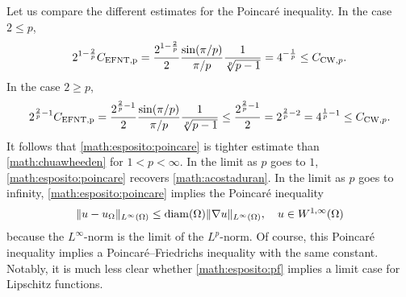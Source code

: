 \documentclass[a4paper]{article}
\begin{document}
\begin{remark}
    Let us compare the different estimates for the Poincar\'e inequality.
    In the case $2 \leq p$, 
    \begin{align*}
        2^{1-\frac 2 p}
        C_{\rm{EFNT},p}
        =
        \frac{ 2^{1-\frac 2 p} }{2}
        \frac{ \sin(\pi/p) }{ \pi/p }
        \frac{ 1 }{ \sqrt[p]{p-1} }
        =
        4^{-\frac 1 p}
        \leq
        C_{{\rm CW},p} 
        .
    \end{align*}
    In the case $2 \geq p$, 
    \begin{align*}
        2^{\frac 2 p - 1}
        C_{\rm{EFNT},p}
        =
        \frac{ 2^{\frac 2 p - 1} }{2}
        \frac{ \sin(\pi/p) }{ \pi/p }
        \frac{ 1 }{ \sqrt[p]{p-1} }
        \leq
        \frac{ 2^{\frac 2 p-1} }{2}
        =
        2^{\frac 2 p - 2}
        =
        4^{\frac 1 p - 1}
        \leq
        C_{{\rm CW},p} 
        .
    \end{align*}
    It follows that \eqref{math:esposito:poincare} is tighter estimate than \eqref{math:chuawheeden} for $1 < p < \infty$.
    In the limit as $p$ goes to $1$, \eqref{math:esposito:poincare} recovers \eqref{math:acostaduran}. 
    In the limit as $p$ goes to infinity, \eqref{math:esposito:poincare} implies the Poincar\'e inequality 
    \begin{align*}
        \| u - u_{\Omega} \|_{L^{\infty}(\Omega)}
        \leq 
        {\operatorname{diam}}(\Omega)
        \| \nabla u \|_{L^{\infty}(\Omega)}
        ,
        \quad
        u \in W^{1,\infty}(\Omega)
    \end{align*}
    because the $L^{\infty}$-norm is the limit of the $L^{p}$-norm. 
    Of course, this Poincar\'e inequality implies a Poincar\'e--Friedrichs inequality with the same constant. 
    Notably, it is much less clear whether \eqref{math:esposito:pf} implies a limit case for Lipschitz functions. 
\end{remark}
\end{document}

